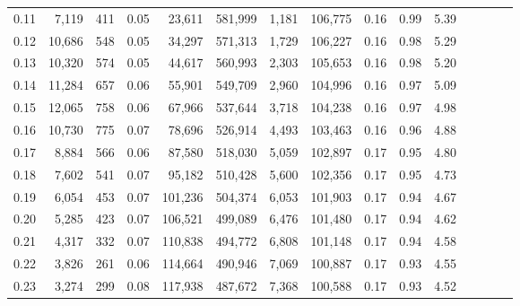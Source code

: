 \begin{tabular}{rrrcrrrrrrrrrrr}
0.11 &   7,119 &    411 &                                       0.05 &   23,611 &  581,999 &    1,181 &  106,775 &  0.16 &  0.99 &                         5.39 \\
0.12 &  10,686 &    548 &                                       0.05 &   34,297 &  571,313 &    1,729 &  106,227 &  0.16 &  0.98 &                         5.29 \\
0.13 &  10,320 &    574 &                                       0.05 &   44,617 &  560,993 &    2,303 &  105,653 &  0.16 &  0.98 &                         5.20 \\
0.14 &  11,284 &    657 &                                       0.06 &   55,901 &  549,709 &    2,960 &  104,996 &  0.16 &  0.97 &                         5.09 \\
0.15 &  12,065 &    758 &                                       0.06 &   67,966 &  537,644 &    3,718 &  104,238 &  0.16 &  0.97 &                         4.98 \\
0.16 &  10,730 &    775 &                                       0.07 &   78,696 &  526,914 &    4,493 &  103,463 &  0.16 &  0.96 &                         4.88 \\
0.17 &   8,884 &    566 &                                       0.06 &   87,580 &  518,030 &    5,059 &  102,897 &  0.17 &  0.95 &                         4.80 \\
0.18 &   7,602 &    541 &                                       0.07 &   95,182 &  510,428 &    5,600 &  102,356 &  0.17 &  0.95 &                         4.73 \\
0.19 &   6,054 &    453 &                                       0.07 &  101,236 &  504,374 &    6,053 &  101,903 &  0.17 &  0.94 &                         4.67 \\
0.20 &   5,285 &    423 &                                       0.07 &  106,521 &  499,089 &    6,476 &  101,480 &  0.17 &  0.94 &                         4.62 \\
0.21 &   4,317 &    332 &                                       0.07 &  110,838 &  494,772 &    6,808 &  101,148 &  0.17 &  0.94 &                         4.58 \\
0.22 &   3,826 &    261 &                                       0.06 &  114,664 &  490,946 &    7,069 &  100,887 &  0.17 &  0.93 &                         4.55 \\
0.23 &   3,274 &    299 &                                       0.08 &  117,938 &  487,672 &    7,368 &  100,588 &  0.17 &  0.93 &                         4.52 \\

\end{tabular}
